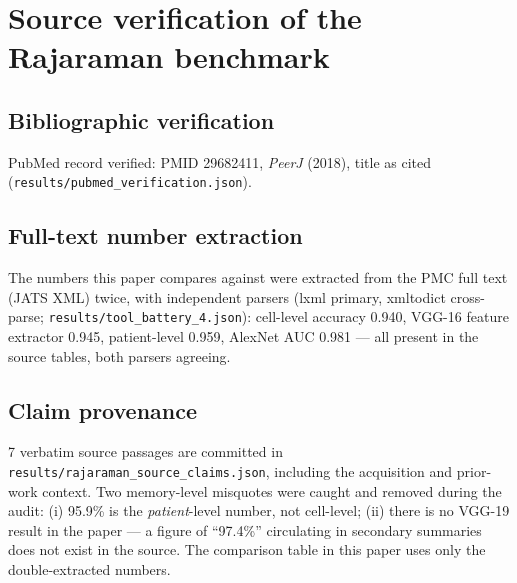 
\section{Source verification of the Rajaraman benchmark}
\subsection{Bibliographic verification}
PubMed record verified: PMID 29682411,
\emph{PeerJ} (2018),
title as cited (\texttt{results/pubmed\_verification.json}).
\subsection{Full-text number extraction}
The numbers this paper compares against were extracted from the PMC full
text (JATS XML) twice, with independent parsers (lxml primary, xmltodict
cross-parse; \texttt{results/tool\_battery\_4.json}): cell-level accuracy
0.940, VGG-16 feature extractor 0.945, patient-level 0.959, AlexNet AUC
0.981 --- all present in the source tables, both parsers agreeing.
\subsection{Claim provenance}
7 verbatim source passages are committed in
\texttt{results/rajaraman\_source\_claims.json}, including the acquisition
and prior-work context. Two memory-level misquotes were caught and removed
during the audit: (i) 95.9\% is the \emph{patient}-level number, not
cell-level; (ii) there is no VGG-19 result in the paper --- a figure of
``97.4\%'' circulating in secondary summaries does not exist in the source.
The comparison table in this paper uses only the double-extracted numbers.
